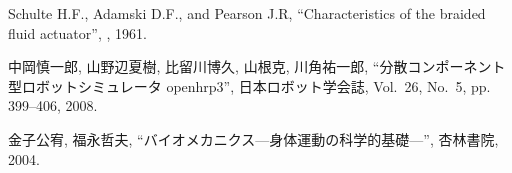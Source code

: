\documentclass[10pt,a4paper]{jsarticle}
\begin{document}
\begin{footnotesize}
\begin{thebibliography}{10}
Schulte H.F., Adamski D.F., and Pearson J.R,
\newblock ``Characteristics of the braided fluid actuator'',
, 1961.

中岡慎一郎, 山野辺夏樹, 比留川博久, 山根克, 川角祐一郎,
\newblock ``分散コンポーネント型ロボットシミュレータ openhrp3'',
\newblock 日本ロボット学会誌, Vol.~26, No.~5, pp. 399--406, 2008.

金子公宥, 福永哲夫,
\newblock ``バイオメカニクス---身体運動の科学的基礎---'',
\newblock 杏林書院, 2004.

\end{thebibliography}



%
%

\end{footnotesize}
\end{document}
